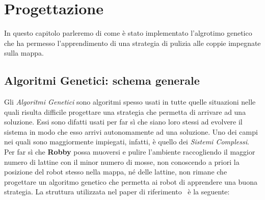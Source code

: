 \chapter{Progettazione}
In questo capitolo parleremo di come è stato implementato l'algrotimo genetico
che ha permesso l'apprendimento di una strategia di pulizia alle coppie
impegnate sulla mappa.

\section{Algoritmi Genetici: schema generale}
Gli \textit{Algoritmi Genetici} sono algoritmi spesso usati in tutte quelle
situazioni nelle quali risulta difficile progettare una strategia che permetta
di arrivare ad una soluzione. Essi sono difatti usati per far sì che siano loro
stessi ad evolvere il sistema in modo che esso arrivi autonomamente ad una
soluzione. Uno dei campi nei quali sono maggiormente impiegati, infatti, è
quello dei \textit{Sistemi Complessi}.\newline
Per far sì che \textbf{Robby} possa muoversi e pulire l'ambiente raccogliendo il
maggior numero di lattine con il minor numero di mosse, non conoscendo a priori
la posizione del robot stesso nella mappa, né delle lattine, non rimane che
progettare un algoritmo genetico che permetta ai robot di apprendere una buona
strategia.\newline
La struttura utilizzata nel paper di riferimento~\cite{biblio:robby} è la
seguente:
